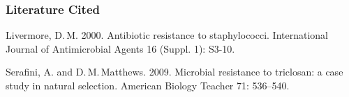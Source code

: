 \documentclass[12pt]{exam}
\newlength{\litindent}
\begin{document}
\begin{questions}
\begin{center}


\end{center}

\end{questions}

\subsubsection*{Literature Cited}

Livermore, D.\,M. 2000. Antibiotic resistance to staphylococci. International Journal of Antimicrobial Agents 16 (Suppl. 1): S3-10.

Serafini, A. and D.\,M.\,Matthews. 2009. Microbial resistance to triclosan: a case study in natural selection. American Biology Teacher 71: 536–540.
\end{document}
